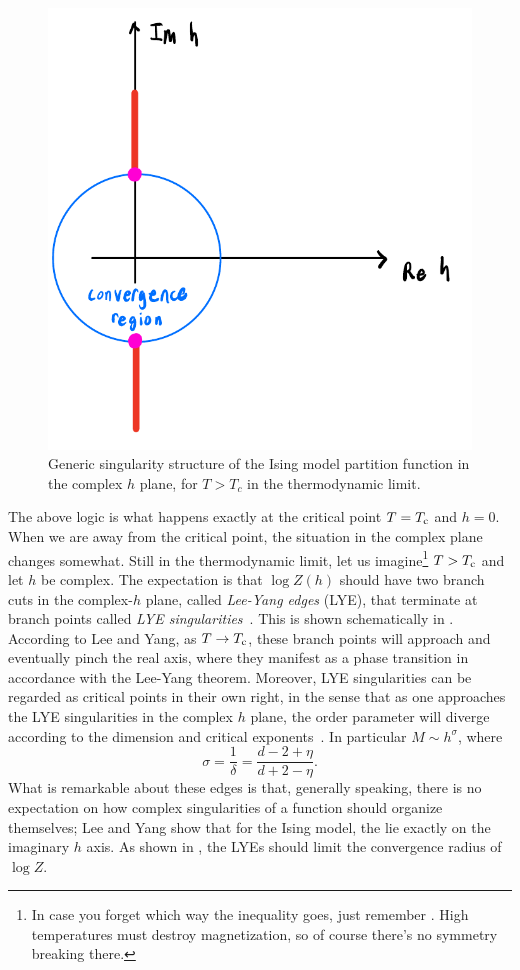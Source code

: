 \begin{figure} 
    \centering
    \includegraphics[width=0.5\linewidth]{figs/LYE.pdf}
    \caption{
        Generic singularity structure of the Ising model partition function in the
        complex $h$ plane, for $T>T_c$ in the thermodynamic limit.
    }
    \label{fig:LYE}
\end{figure}


The above logic is what happens exactly at the critical point $T=T_{\rm c}$ and $h=0$.
When we are away from the critical point, the situation in the complex plane
changes somewhat. Still in the thermodynamic limit, let us 
imagine\footnote{In case you forget which way the inequality goes, just
remember . High temperatures must destroy
magnetization, so of course there's no symmetry breaking there.} $T>T_{\rm c}$ 
and let $h$ be complex. The expectation is that $\log Z(h)$ should
have two branch cuts in the complex-$h$ plane, called 
{\it Lee-Yang edges} (LYE), that terminate at
branch points called {\it LYE singularities}~\cite{lee_statistical_1952}.
This is shown schematically in . According to Lee and Yang, 
as $T\to T_{\rm c}$, these branch points will approach and eventually
pinch the real axis, where they manifest as a phase transition
in accordance with the Lee-Yang theorem.
Moreover, LYE singularities can be regarded as critical points in their
own right, in the sense that as one approaches the LYE singularities 
in the complex $h$ plane, the order parameter will diverge
according to the dimension and critical 
exponents~\cite{fisher_yang-lee_1978}. In particular $M\sim h^\sigma$, where
\begin{equation}
\sigma=\frac{1}{\delta}=\frac{d-2+\eta}{d+2-\eta}.
\end{equation}
What is remarkable about these edges is that, generally speaking,
there is no expectation on how complex singularities of a function
should organize themselves; Lee and Yang show that for the Ising model,
the lie exactly on the imaginary $h$ axis.
As shown in , the LYEs should limit the convergence
radius of $\log Z$. 

